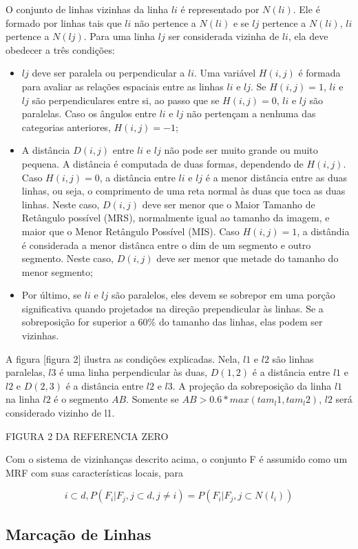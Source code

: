 O conjunto de linhas vizinhas da linha $li$ é representado por $N(li)$. Ele é formado por linhas tais que $li$ não pertence a $N(li)$ e se $lj$ pertence a $N(li)$, $li$ pertence a $N(lj)$. Para uma linha $lj$ ser considerada vizinha de $li$, ela deve obedecer a três condições:
\begin{itemize}
\item $lj$ deve ser paralela ou perpendicular a $li$. Uma variável $H(i,j)$ é formada para avaliar as relações espaciais entre as linhas $li$ e $lj$. Se $H(i,j) = 1$, $li$ e $lj$ são perpendiculares entre si, ao passo que se $H(i,j) = 0$, $li$ e $lj$ são paralelas. Caso os ângulos entre $li$ e $lj$ não pertençam a nenhuma das categorias anteriores, $H(i,j) = -1$;
\item A distância $D(i,j)$ entre $li$ e $lj$ não pode ser muito grande ou muito pequena. A distância é computada de duas formas, dependendo de $H(i,j)$. Caso $H(i,j) = 0$, a distância entre $li$ e $lj$ é a menor distância entre as duas linhas, ou seja, o comprimento de uma reta normal às duas que toca as duas linhas. Neste caso, $D(i,j)$ deve ser menor que o Maior Tamanho de Retângulo possível (MRS), normalmente igual ao tamanho da imagem, e maior que o Menor Retângulo Possível (MIS).  Caso $H(i,j) = 1$, a distândia é considerada a menor distânca entre o dim de um segmento e outro segmento. Neste caso, $D(i,j)$ deve ser menor que metade do tamanho do menor segmento;
\item Por último, se $li$ e $lj$ são paralelos, eles devem se sobrepor em uma porção significativa quando projetados na direção prependicular às linhas. Se a sobreposição for superior a 60\% do tamanho das linhas, elas podem ser vizinhas. 
\end{itemize}
 A figura [figura 2] ilustra as condições explicadas. Nela, $l1$ e $l2$ são linhas paralelas, $l3$ é uma linha perpendicular às duas, $D(1,2)$ é a distância entre $l1$ e $l2$ e $D(2,3)$ é a distância entre $l2$ e $l3$. A projeção da sobreposição da linha $l1$ na linha $l2$ é o segmento $AB$. Somente se $AB > 0.6*max(tam_l1,tam_l2)$, $l2$ será considerado vizinho de l1.

FIGURA 2 DA REFERENCIA ZERO

Com o sistema de vizinhanças descrito acima, o conjunto F é assumido como um MRF com suas características locais, para

$$ i \subset d, P(F_i|F_j,j \subset d, j \neq i) = P(F_i|F_j, j \subset N(l_i)) $$

\subsection{Marcação de Linhas}

